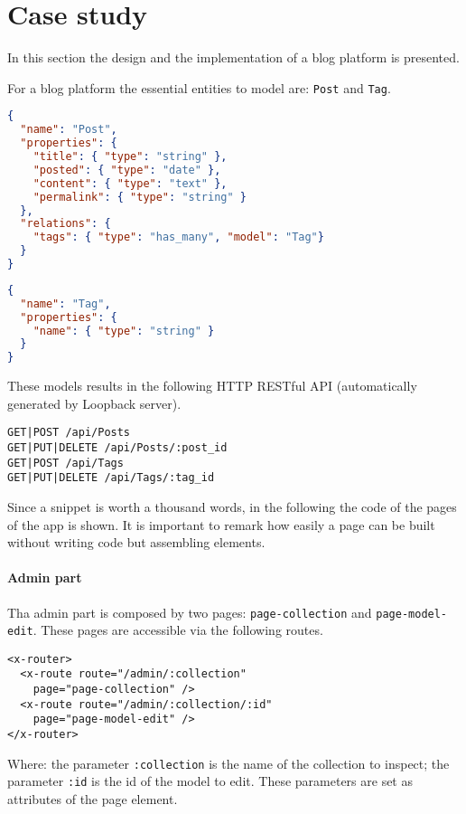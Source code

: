 \section{Case study}\label{sec:case-study}
In this section the design and the implementation of a blog platform is presented. 

For a blog platform the essential entities to model are: \texttt{Post} and \texttt{Tag}.

\begin{lstlisting}[language=json]
{
  "name": "Post",
  "properties": {
    "title": { "type": "string" },
    "posted": { "type": "date" },
    "content": { "type": "text" },
    "permalink": { "type": "string" }
  }, 
  "relations": {
    "tags": { "type": "has_many", "model": "Tag"}
  }
}
\end{lstlisting}

\begin{lstlisting}[language=json]
{
  "name": "Tag",
  "properties": {
    "name": { "type": "string" }
  }
}
\end{lstlisting}

These models results in the following HTTP RESTful API (automatically generated by Loopback server).

\begin{lstlisting}
GET|POST /api/Posts
GET|PUT|DELETE /api/Posts/:post_id
GET|POST /api/Tags
GET|PUT|DELETE /api/Tags/:tag_id
\end{lstlisting}

Since a snippet is worth a thousand words, in the following the code of the pages of the app is shown.
It is important to remark how easily a page can be built without writing code but assembling elements. 

\paragraph{Admin part}

Tha admin part is composed by two pages: \texttt{page-collection} and \texttt{page-model-edit}.
These pages are accessible via the following routes.

\begin{lstlisting}[language=HTML5]
<x-router>
  <x-route route="/admin/:collection" 
    page="page-collection" />
  <x-route route="/admin/:collection/:id"
    page="page-model-edit" />
</x-router>
\end{lstlisting}

Where:
the parameter \texttt{:collection} is the name of the collection to inspect;
the parameter \texttt{:id} is the id of the model to edit.
These parameters are set as attributes of the page element.

